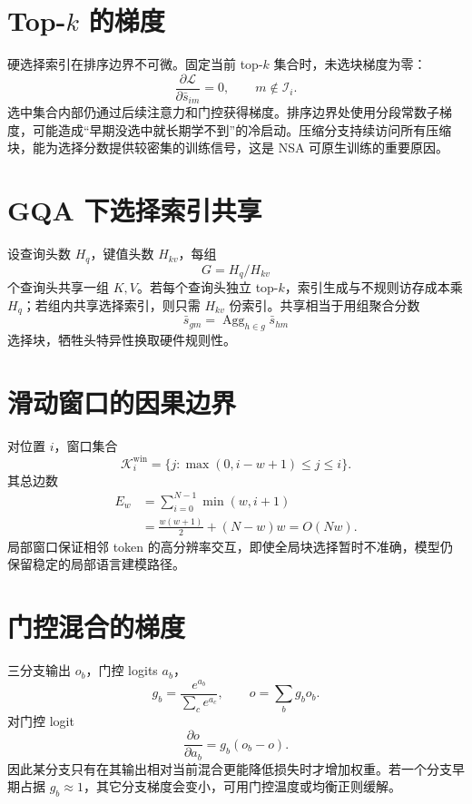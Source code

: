 \documentclass[UTF8,12pt,a4paper,fontset=none]{ctexart}
\numberwithin{equation}{section}
\newcommand{\Loss}{\mathcal{L}}
\begin{document}
\section{Top-$k$ 的梯度}
硬选择索引在排序边界不可微。固定当前 top-$k$ 集合时，未选块梯度为零：
\begin{equation}
 \frac{\partial\Loss}{\partial\bar s_{im}}=0,
 \qquad m\notin\mathcal I_i.
\end{equation}
选中集合内部仍通过后续注意力和门控获得梯度。排序边界处使用分段常数子梯度，可能造成“早期没选中就长期学不到”的冷启动。压缩分支持续访问所有压缩块，能为选择分数提供较密集的训练信号，这是 NSA 可原生训练的重要原因。

\section{GQA 下选择索引共享}
设查询头数 $H_q$，键值头数 $H_{kv}$，每组
\begin{equation}
 G=H_q/H_{kv}
\end{equation}
个查询头共享一组 $K,V$。若每个查询头独立 top-$k$，索引生成与不规则访存成本乘 $H_q$；若组内共享选择索引，则只需 $H_{kv}$ 份索引。共享相当于用组聚合分数
\begin{equation}
 \bar s_{gm}=\operatorname{Agg}_{h\in g}\bar s_{hm}
\end{equation}
选择块，牺牲头特异性换取硬件规则性。

\section{滑动窗口的因果边界}
对位置 $i$，窗口集合
\begin{equation}
 \mathcal K_i^{\mathrm{win}}
 =\{j:\max(0,i-w+1)\le j\le i\}.
\end{equation}
其总边数
\begin{align}
 E_w
 &=\sum_{i=0}^{N-1}\min(w,i+1)\\
 &=\frac{w(w+1)}2+(N-w)w
 =O(Nw).
\end{align}
局部窗口保证相邻 token 的高分辨率交互，即使全局块选择暂时不准确，模型仍保留稳定的局部语言建模路径。

\section{门控混合的梯度}
三分支输出 $o_b$，门控 logits $a_b$，
\begin{equation}
 g_b=\frac{e^{a_b}}{\sum_ce^{a_c}},
 \qquad o=\sum_bg_bo_b.
\end{equation}
对门控 logit
\begin{equation}
 \frac{\partial o}{\partial a_b}
 =g_b(o_b-o).
\end{equation}
因此某分支只有在其输出相对当前混合更能降低损失时才增加权重。若一个分支早期占据 $g_b\approx1$，其它分支梯度会变小，可用门控温度或均衡正则缓解。
\end{document}
